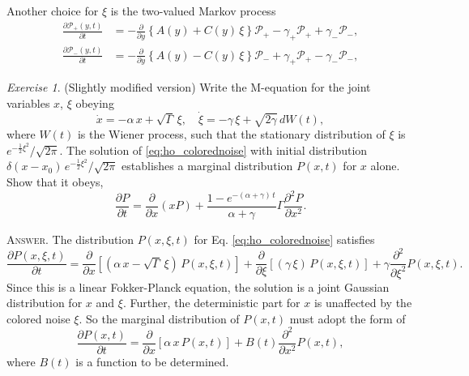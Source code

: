\documentclass{book}
\numberwithin{equation}{section}
\theoremstyle{plain}
\theoremstyle{definition}
\theoremstyle{remark}
\theoremstyle{BoldStyle}
\newtheorem{exercise}{Exercise}
\numberwithin{exercise}{section}
\newcommand{\answer}[1]{{\color{DarkBlue}\footnotesize \textsc{Answer.} #1}}
\begin{document}
Another choice for $\xi$ is the two-valued Markov process
\begin{equation}
\begin{aligned}
  \frac{ \partial \mathscr P_+(y, t) } { \partial t }
  &=
  - \frac{ \partial } { \partial y }
  \left\{
    A(y) + C(y) \, \xi
  \right\} \mathscr P_+
  -\gamma_+ \mathscr P_+ + \gamma_- \mathscr P_-,
  \\
  \frac{ \partial \mathscr P_-(y, t) } { \partial t }
  &=
  - \frac{ \partial } { \partial y }
  \left\{
    A(y) - C(y) \, \xi
  \right\} \mathscr P_-
  + \gamma_+ \mathscr P_+ - \gamma_- \mathscr P_-,
\end{aligned}
\label{eq:Langevin_joint_y_xi}
\end{equation}


\begin{exercise}
  (Slightly modified version)
  Write the M-equation for the joint variables $x$, $\xi$ obeying
  \begin{equation}
  \dot x = -\alpha \, x + \sqrt{\Gamma} \, \xi,
  \quad
  \dot \xi = -\gamma \, \xi + \sqrt{2 \gamma} \, d W(t),
  \label{eq:ho_colorednoise}
  \end{equation}
  where $W(t)$ is the Wiener process,
  such that the stationary distribution of $\xi$
  is $e^{-\frac{1}{2}\xi^2}/\sqrt{2\pi}$.
  The solution of \eqref{eq:ho_colorednoise} with initial distribution
  $\delta(x - x_0) \, e^{-\frac{1}{2}\xi^2}/\sqrt{2\pi}$
  establishes a marginal distribution $P(x, t)$
  for $x$ alone. Show that it obeys,
  \begin{equation}
  \frac{ \partial P } { \partial t } = \frac{ \partial } { \partial x } (x P)
  +
  \frac{ 1 - e^{-(\alpha + \gamma) \, t} } {\alpha + \gamma} \Gamma
  \frac{ \partial^2 P } { \partial x^2 }.
  \label{eq:ho_colorednoise_Px}
  \end{equation}

  \answer{
    The distribution $P(x, \xi, t)$ for
    Eq. \eqref{eq:ho_colorednoise} satisfies
    $$
    \frac{ \partial P(x, \xi, t) } { \partial t }
    =
    \frac{ \partial } { \partial x }
    \left[
      \left( \alpha \, x - \sqrt{\Gamma} \, \xi \right) \, P(x, \xi, t)
    \right]
    +
    \frac{ \partial } { \partial \xi }
    \left[
      (\gamma \, \xi ) \, P(x, \xi, t)
    \right]
    +
    \gamma
    \frac{ \partial^2 } { \partial \xi^2} P(x, \xi, t).
    $$
    Since this is a linear Fokker-Planck equation,
    the solution is a joint Gaussian distribution
    for $x$ and $\xi$.
    Further, the deterministic part for $x$
    is unaffected by the colored noise $\xi$.
    So the marginal distribution of $P(x, t)$
    must adopt the form of
    \begin{equation}
    \frac{ \partial P(x, t) } { \partial t }
    =
    \frac{ \partial } { \partial x }
    \left[
      \alpha \, x \, P(x, t)
    \right]
    +
    B(t)
    \frac{ \partial^2 } { \partial x^2} P(x, t),
    \label{eq:ho_colorednoise_Px1}
    \end{equation}
    where $B(t)$
    is a function to be determined.

}
\end{exercise}
\end{document}
